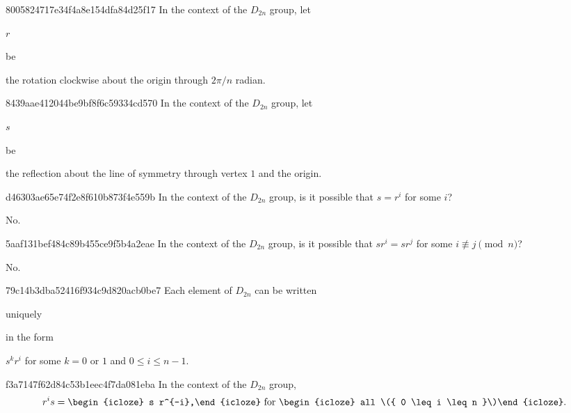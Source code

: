 \begin{note}{8005824717e34f4a8e154dfa84d25f17}
    In the context of the \({ D_{2n} }\) group, let \begin{icloze}{2}\({ r }\)\end{icloze} be \begin{icloze}{1}the rotation clockwise about the origin through \({ 2\pi / n }\) radian.\end{icloze}
\end{note}

\begin{note}{8439aae412044be9bf8f6c59334cd570}
    In the context of the \({ D_{2n} }\) group, let \begin{icloze}{2}\({ s }\)\end{icloze} be \begin{icloze}{1}the reflection about the line of symmetry through vertex \({ 1 }\) and the origin.\end{icloze}
\end{note}

\begin{note}{d46303ae65e74f2e8f610b873f4e559b}
    In the context of the \({ D_{2n} }\) group,
    is it possible that \({ s = r^{i} }\) for some \({ i }\)?

    \begin{cloze}{1}
        No.
    \end{cloze}
\end{note}

\begin{note}{5aaf131bef484c89b455ce9f5b4a2eae}
    In the context of the \({ D_{2n} }\) group,
    is it possible that \({ s r^{i} = s r ^{j} }\) for some \({ i \not \equiv j \pmod n }\)?

    \begin{cloze}{1}
        No.
    \end{cloze}
\end{note}

\begin{note}{79c14b3dba52416f934c9d820acb0be7}
    Each element of \({ D_{2n} }\) can be written \begin{icloze}{2}uniquely\end{icloze} in the form \begin{icloze}{1}\({ s^{k}r^{i} }\) for some \({ k = 0 }\) or \({ 1 }\) and \({ 0 \leq i \leq n - 1 }\).\end{icloze}
\end{note}

\begin{note}{f3a7147f62d84c53b1eec4f7da081eba}
    In the context of the \({ D_{2n} }\) group,
    \[
        r^{i}s = \begin{icloze}{1}s r^{-i},\end{icloze}\ \text{for \begin{icloze}{2}all \({ 0 \leq i \leq n }\)\end{icloze}}.
    \]
\end{note}

